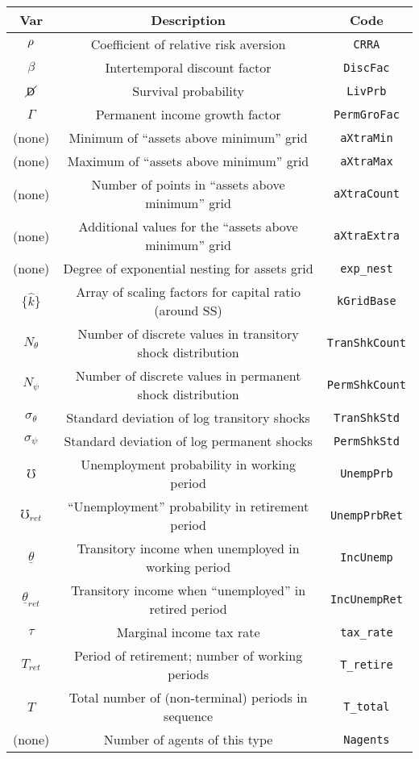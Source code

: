 \documentclass[12pt,titlepage,letterpaper]{econtex}
\begin{document}
\begin{table}[h!]
\centering
\begin{tabular}{c c c}
Var & Description & Code \\
\hline
$\rho$ & Coefficient of relative risk aversion & \texttt{CRRA} \\
$\beta$ & Intertemporal discount factor & \texttt{DiscFac} \\
$\cancel{\mathsf{D}}$ & Survival probability & \texttt{LivPrb} \\
$\Gamma$ & Permanent income growth factor & \texttt{PermGroFac} \\
(none) & Minimum of ``assets above minimum'' grid & \texttt{aXtraMin} \\
(none) & Maximum of ``assets above minimum'' grid & \texttt{aXtraMax} \\
(none) & Number of points in ``assets above minimum'' grid & \texttt{aXtraCount} \\
(none) & Additional values for the ``assets above minimum'' grid & \texttt{aXtraExtra} \\
(none) & Degree of exponential nesting for assets grid & \texttt{exp\_nest} \\
$\{\hat{k}\}$ & Array of scaling factors for capital ratio (around SS) & \texttt{kGridBase} \\
$N_{\theta}$ & Number of discrete values in transitory shock distribution & \texttt{TranShkCount} \\
$N_{\psi}$ & Number of discrete values in permanent shock distribution & \texttt{PermShkCount} \\
$\sigma_\theta$ & Standard deviation of log transitory shocks & \texttt{TranShkStd} \\
$\sigma_\psi$ & Standard deviation of log permanent shocks & \texttt{PermShkStd} \\
$\mho$ & Unemployment probability in working period & \texttt{UnempPrb} \\
$\mho_{ret}$ & ``Unemployment'' probability in retirement period & \texttt{UnempPrbRet} \\
$\underline{\theta}$ & Transitory income when unemployed in working period & \texttt{IncUnemp} \\
$\underline{\theta}_{ret}$ & Transitory income when ``unemployed'' in retired period & \texttt{IncUnempRet} \\
$\tau$ & Marginal income tax rate & \texttt{tax\_rate} \\
$T_{ret}$ & Period of retirement; number of working periods & \texttt{T\_retire} \\
$T$ & Total number of (non-terminal) periods in sequence & \texttt{T\_total} \\
(none) & Number of agents of this type & \texttt{Nagents}
\end{tabular}
\end{table}
\end{document}
